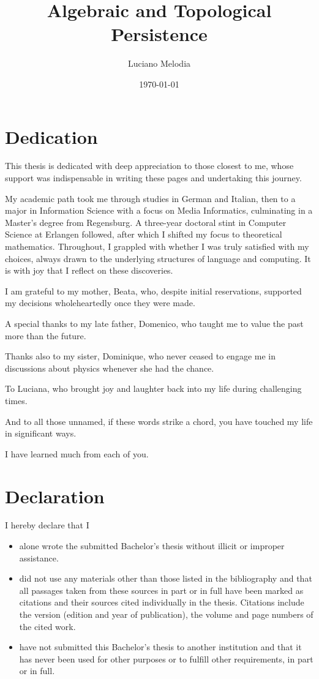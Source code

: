 \documentclass[b5paper, 12pt, twoside]{report}
\title{Algebraic and Topological Persistence}
\author{Luciano Melodia}
\date{\today}
\begin{document}
	
	

	\chapter*{Dedication}

	This thesis is dedicated with deep appreciation to those closest to me, whose support was indispensable in writing these pages and undertaking this journey.

	My academic path took me through studies in German and Italian, then to a major in Information Science with a focus on Media Informatics, culminating in a Master’s degree from Regensburg. A three-year doctoral stint in Computer Science at Erlangen followed, after which I shifted my focus to theoretical mathematics. Throughout, I grappled with whether I was truly satisfied with my choices, always drawn to the underlying structures of language and computing. It is with joy that I reflect on these discoveries.

	I am grateful to my mother, Beata, who, despite initial reservations, supported my decisions wholeheartedly once they were made.

	A special thanks to my late father, Domenico, who taught me to value the past more than the future.

	Thanks also to my sister, Dominique, who never ceased to engage me in discussions about physics whenever she had the chance.

	To Luciana, who brought joy and laughter back into my life during challenging times.

	And to all those unnamed, if these words strike a chord, you have touched my life in significant ways.

	I have learned much from each of you.

	\chapter*{Declaration}

	I hereby declare that I

	\begin{itemize}
		\item alone wrote the submitted Bachelor's thesis without illicit or improper
			assistance.

		\item did not use any materials other than those listed in the bibliography and
			that all passages taken from these sources in part or in full have been marked
			as citations and their sources cited individually in the thesis. Citations
			include the version (edition and year of publication), the volume and page
			numbers of the cited work.

		\item have not submitted this Bachelor's thesis to another institution and that
			it has never been used for other purposes or to fulfill other requirements,
			in part or in full.
	\end{itemize}
\end{document}

